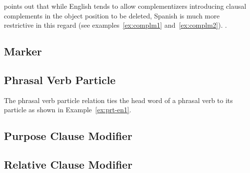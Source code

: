 \documentclass[main.tex]{subfiles}
\begin{document}
\citet{whitley:1986} points out that while English tends to allow complementizers introducing clausal complements in the object position to be deleted, Spanish is much more restrictive in this regard (see examples~\ref{ex:complm1} and~\ref{ex:complm2}). \citep[p.278]{whitley:1986}.





\subsection{Marker}
\subsection{Phrasal Verb Particle}

The phrasal verb particle relation ties the head word of a phrasal verb to its particle as shown in Example~\ref{ex:prt-en1}. 
\subsection{Purpose Clause Modifier}
\subsection{Relative Clause Modifier}

\biblio
\end{document}
